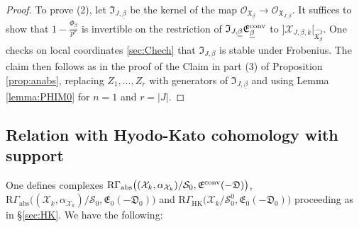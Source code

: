 \documentclass[asterisque,english]{smfart}
\begin{document}
\begin{proof}




To prove (2), let  $\mathfrak{I}_{J,\underline{\beta}}$  be the kernel of the map $\mathcal{O}_{\mathfrak{X}_{\underline{\beta}}} \to \mathcal{O}_{\mathfrak{X}_{{J,\underline{\beta}}}}$.  It  suffices to show that $1-\frac{\Phi_{\underline{\beta}}}{p^r}$
is invertible on the restriction of $\mathfrak{I}_{J,\underline{\beta}}\mathfrak{E}_{\underline{\beta}}^{\rm conv}$ to $]\mathcal{X}_{J,\underline{\beta},k}[_{\widehat{{\mathfrak{X}}_{\underline{\beta}}^J}}$.  One checks on local coordinates \ref{sec:Chech} that  $\mathfrak{I}_{J,\underline{\beta}}$ is stable under Frobenius. The claim then follows as in the proof of the Claim in part (3) of Proposition \ref{prop:anabs}, replacing $Z_1,\ldots,Z_r$ with generators of $\mathfrak{I}_{J,\underline{\beta}}$ and using Lemma \ref{lemma:PHIM0} for $n=1$ and $r=\vert J \vert$.
\end{proof}

\subsection{Relation with Hyodo-Kato cohomology with support}\label{sec:HKcompact}

One defines complexes  $\mathrm{R}\Gamma_{\mathrm{abs}}\bigl((\mathcal{X}_k,\alpha_{\mathcal{X}_k})/\mathcal{S}_0,\mathfrak{E}^{\rm conv}(-\mathfrak{D})\bigr)$,  $\mathrm{R}\Gamma_{\mathrm{abs}}\bigl((\mathcal{X}_k,\alpha_{\mathcal{X}_k})/\mathcal{S}_0,\mathfrak{E}_0(-\mathfrak{D}_0)\bigr)$ and $\mathrm{R}\Gamma_{\mathrm{HK}}\bigl(\mathcal{X}_k/ \mathcal{S}_0^0,\mathfrak{E}_0(-\mathfrak{D}_0)\bigr)$ proceeding as in \S \ref{sec:HK}. We have the following:
\end{document}
